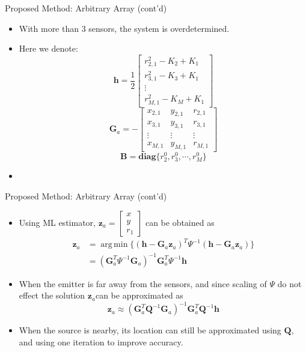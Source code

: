\documentclass[10pt]{beamer}
\DeclareMathOperator*{\argmin}{arg\,min}
\begin{document}
\begin{frame}{Proposed Method: Arbitrary Array (cont'd)}
  \begin{itemize}
    \item With more than 3 sensors, the system is overdetermined.
    \item Here we denote:
            $$\mathbf{h}= \frac{1}{2}
              \begin{bmatrix}r_{2,1}^2-K_2+K_1 \\
                             r_{3,1}^2-K_3+K_1 \\
                             \vdots \\
                             r_{M,1}^2-K_M+K_1\end{bmatrix}$$
            $$\mathbf{G}_a=-
              \begin{bmatrix} x_{2,1} & y_{2,1} & r_{2,1} \\
                              x_{3,1} & y_{3,1} & r_{3,1} \\
                              \vdots  & \vdots  & \vdots  \\
                              x_{M,1} & y_{M,1} & r_{M,1} \end{bmatrix}$$
            $$\mathbf{B}= \textbf{diag} \{r_2^0,r_3^0,\cdots,r_M^0\}$$
    \item
  \end{itemize}
\end{frame}

\begin{frame}{Proposed Method: Arbitrary Array (cont'd)}
  \begin{itemize}
    \item Using ML estimator, $\mathbf{z}_a=\begin{bmatrix}x\\y\\r_1\end{bmatrix}$ can be obtained as
          $$\begin{align}
            \mathbf{z}_a&=\argmin\{(\mathbf{h}-\mathbf{G}_a\mathbf{z}_a)^T
                                    \Psi^{-1}(\mathbf{h}-\mathbf{G}_a\mathbf{z}_a)\}\\
                        &=(\mathbf{G}_a^T\Psi^{-1}\mathbf{G}_a)^{-1}\mathbf{G}_a^T\Psi^{-1}\mathbf{h}
            \end{align}$$
    \item When the emitter is far away from the sensors,
          and since scaling of $\Psi$ do not effect the solution
          $\mathbf{z}_a$can be approximated as
          $$\mathbf{z}_a\approx(\mathbf{G}_a^T\mathbf{Q}^{-1}
            \mathbf{G}_a)^{-1}\mathbf{G}_a^T\mathbf{Q}^{-1}\mathbf{h}$$
    \item When the source is nearby, its location can still be approximated
          using $\mathbf{Q}$, and using one iteration to improve accuracy.
  \end{itemize}
\end{frame}
\end{document}
